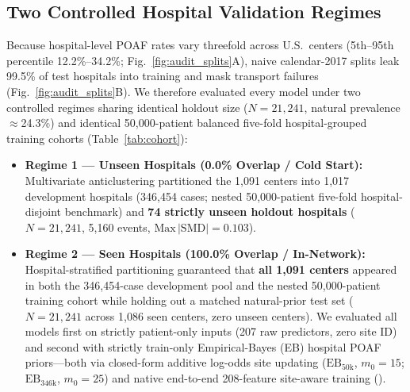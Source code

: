 \subsection{Two Controlled Hospital Validation Regimes}
Because hospital-level POAF rates vary threefold across U.S.\ centers (5th--95th percentile 12.2\%--34.2\%; Fig.~\ref{fig:audit_splits}A), naive calendar-2017 splits leak 99.5\% of test hospitals into training and mask transport failures (Fig.~\ref{fig:audit_splits}B). We therefore evaluated every model under two controlled regimes sharing identical holdout size ($N{=}21{,}241$, natural prevalence $\approx$24.3\%) and identical 50,000-patient balanced five-fold hospital-grouped training cohorts (Table~\ref{tab:cohort}):
\begin{itemize}
  \item \textbf{Regime 1 — Unseen Hospitals (0.0\% Overlap / Cold Start):} Multivariate anticlustering partitioned the 1,091 centers into 1,017 development hospitals (346,454 cases; nested 50,000-patient five-fold hospital-disjoint benchmark) and \textbf{74 strictly unseen holdout hospitals} ($N{=}21{,}241$, 5,160 events, $\mathrm{Max}\,|\mathrm{SMD}|=0.103$).\cite{papenberg2021anticlustering,joseph2022split}
  \item \textbf{Regime 2 — Seen Hospitals (100.0\% Overlap / In-Network):} Hospital-stratified partitioning guaranteed that \textbf{all 1,091 centers} appeared in both the 346,454-case development pool and the nested 50,000-patient training cohort while holding out a matched natural-prior test set ($N{=}21{,}241$ across 1,086 seen centers, zero unseen centers). We evaluated all models first on strictly patient-only inputs (207 raw predictors, zero site ID) and second with strictly train-only Empirical-Bayes (EB) hospital POAF priors---both via closed-form additive log-odds site updating ($\mathrm{EB}_{50\mathrm{k}}$, $m_0{=}15$; $\mathrm{EB}_{346\mathrm{k}}$, $m_0{=}25$) and native end-to-end 208-feature site-aware training ().
\end{itemize}

